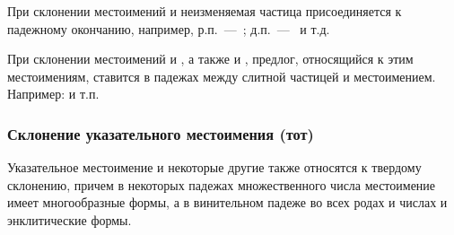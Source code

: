 \documentclass[11pt,a4paper,oneside]{memoir}
\begin{document}
    При склонении местоимений {} и {} неизменяемая частица {} присоединяется к падежному окончанию, например, р.п.~---~{}; д.п.~---~{} и т.д.
    
    При склонении местоимений {} и {}, а также {} и {}, предлог, относящийся к этим местоимениям, ставится в падежах между слитной частицей {} и местоимением. Например: {} и т.п.

                \subsubsection{Склонение указательного местоимения {} (тот)}

    Указательное местоимение {} и некоторые другие также относятся к твердому склонению, причем в некоторых падежах множественного числа местоимение {} имеет многообразные формы, а в винительном падеже во всех родах и числах и энклитические формы.
\end{document}

